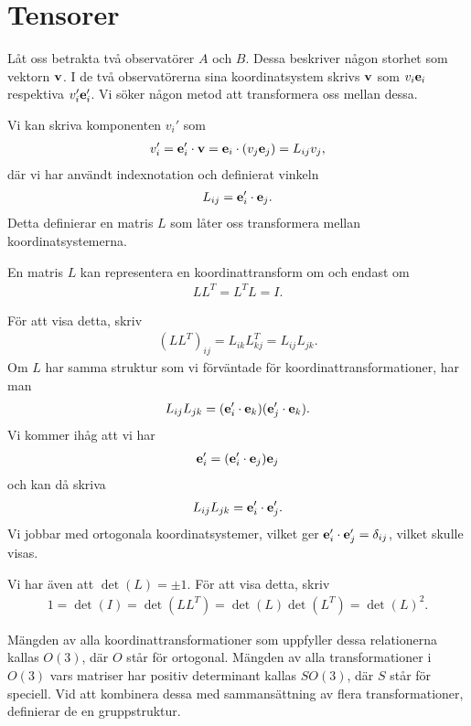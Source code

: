 \section{Tensorer}

Låt oss betrakta två observatörer $A$ och $B$. Dessa beskriver någon storhet som vektorn $\vb{v}$. I de två observatörerna sina koordinatsystem skrivs $\vb{v}$ som $v_i\vb{e}_{i}$ respektiva $v_i'\vb{e}_{i}'$. Vi söker någon metod att transformera oss mellan dessa.

Vi kan skriva komponenten $v_i'$ som
\begin{align*}
	v_i' = \vb{e}_{i}'\cdot\vb{v} = \vb{e}_{i}\cdot (v_j\vb{e}_{j}) = L_{ij}v_{j},
\end{align*}
där vi har användt indexnotation och definierat vinkeln
\begin{align*}
	L_{ij} = \vb{e}_{i}'\cdot\vb{e}_{j}.
\end{align*}
Detta definierar en matris $L$ som låter oss transformera mellan koordinatsystemerna.

En matris $L$ kan representera en koordinattransform om och endast om
\begin{align*}
	LL^{T} = L^{T}L = I.
\end{align*}

För att visa detta, skriv
\begin{align*}
	(LL^{T})_{ij} = L_{ik}L^{T}_{kj} = L_{ij}L_{jk}.
\end{align*}
Om $L$ har samma struktur som vi förväntade för koordinattransformationer, har man
\begin{align*}
	L_{ij}L_{jk} = (\vb{e}_{i}'\cdot\vb{e}_{k})(\vb{e}_{j}'\cdot\vb{e}_{k}).
\end{align*}
Vi kommer ihåg att vi har
\begin{align*}
	\vb{e}_{i}' = (\vb{e}_{i}'\cdot\vb{e}_{j})\vb{e}_{j}
\end{align*}
och kan då skriva
\begin{align*}
	L_{ij}L_{jk} = \vb{e}_{i}'\cdot\vb{e}_{j}'.
\end{align*}
Vi jobbar med ortogonala koordinatsystemer, vilket ger $\vb{e}_{i}'\cdot\vb{e}_{j}' = \delta_{ij}$, vilket skulle visas.

Vi har även att $\det (L) = \pm 1$. För att visa detta, skriv
\begin{align*}
	1 = \det (I) = \det (LL^{T}) = \det (L)\det (L^{T}) = \det (L)^2.
\end{align*}

Mängden av alla koordinattransformationer som uppfyller dessa relationerna kallas $O(3)$, där $O$ står för ortogonal. Mängden av alla transformationer i $O(3)$ vars matriser har positiv determinant kallas $SO(3)$, där $S$ står för speciell. Vid att kombinera dessa med sammansättning av flera transformationer, definierar de en gruppstruktur. 


